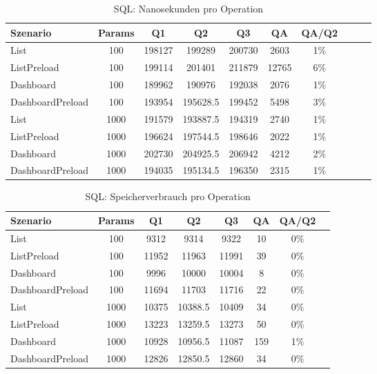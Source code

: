 
\begin{table}[ht]
\centering
\caption{SQL: Nanosekunden pro Operation}
\begin{tabular}{lccccccccc}
\toprule
Szenario & Params & Q1 & Q2 & Q3 & QA & QA/Q2 \\
\midrule
	List & 100 & 198127 & 199289 & 200730 & 2603 & 1\% \\
	ListPreload & 100 & 199114 & 201401 & 211879 & 12765 & 6\% \\
	Dashboard & 100 & 189962 & 190976 & 192038 & 2076 & 1\% \\
	DashboardPreload & 100 & 193954 & 195628.5 & 199452 & 5498 & 3\% \\
	List & 1000 & 191579 & 193887.5 & 194319 & 2740 & 1\% \\
	ListPreload & 1000 & 196624 & 197544.5 & 198646 & 2022 & 1\% \\
	Dashboard & 1000 & 202730 & 204925.5 & 206942 & 4212 & 2\% \\
	DashboardPreload & 1000 & 194035 & 195134.5 & 196350 & 2315 & 1\% \\
\bottomrule
\end{tabular}
\label{tab:benchmark_sql_nsperop}
\end{table}
	
\begin{table}[ht]
\centering
\caption{SQL: Speicherverbrauch pro Operation}
\begin{tabular}{lccccccc}
\toprule
Szenario & Params & Q1 & Q2 & Q3 & QA & QA/Q2 \\
\midrule
	List & 100 & 9312 & 9314 & 9322 & 10 & 0\% \\
	ListPreload & 100 & 11952 & 11963 & 11991 & 39 & 0\% \\
	Dashboard & 100 & 9996 & 10000 & 10004 & 8 & 0\% \\
	DashboardPreload & 100 & 11694 & 11703 & 11716 & 22 & 0\% \\
	List & 1000 & 10375 & 10388.5 & 10409 & 34 & 0\% \\
	ListPreload & 1000 & 13223 & 13259.5 & 13273 & 50 & 0\% \\
	Dashboard & 1000 & 10928 & 10956.5 & 11087 & 159 & 1\% \\
	DashboardPreload & 1000 & 12826 & 12850.5 & 12860 & 34 & 0\% \\
\bottomrule
\end{tabular}
\label{tab:benchmark_sql_bytesperop}
\end{table}
	
